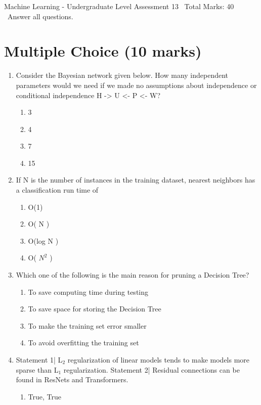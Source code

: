 \documentclass[12pt]{article}
\begin{document}
\begin{center}
Machine Learning - Undergraduate Level Assessment 13 \
Total Marks: 40 \
Answer all questions.
\end{center}

\section*{Multiple Choice (10 marks)}
\begin{enumerate}[label=\arabic*.]
\item Consider the Bayesian network given below. How many independent parameters would we need if we made no assumptions about independence or conditional independence H -\textgreater{} U \textless{}- P \textless{}- W?
\begin{enumerate}[label=(\alph*)]
    \item 3
    \item 4
    \item 7
    \item 15
\end{enumerate}
\item If N is the number of instances in the training dataset, nearest neighbors has a classification run time of
\begin{enumerate}[label=(\alph*)]
    \item O(1)
    \item O( N )
    \item O(log N )
    \item O( $N^2$ )
\end{enumerate}
\item Which one of the following is the main reason for pruning a Decision Tree?
\begin{enumerate}[label=(\alph*)]
    \item To save computing time during testing
    \item To save space for storing the Decision Tree
    \item To make the training set error smaller
    \item To avoid overfitting the training set
\end{enumerate}
\item Statement 1| L$_{2}$ regularization of linear models tends to make models more sparse than L$_{1}$ regularization. Statement 2| Residual connections can be found in ResNets and Transformers.
\begin{enumerate}[label=(\alph*)]
    \item True, True

\end{enumerate}
\end{enumerate}
\end{document}
